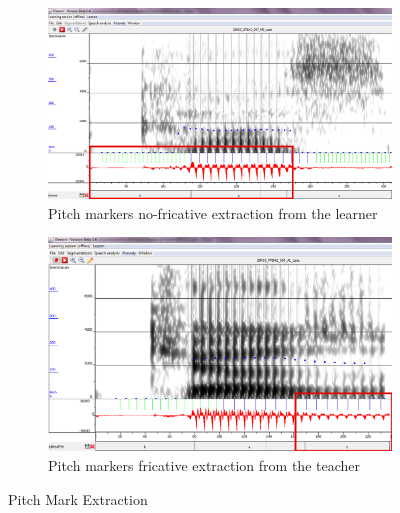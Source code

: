 \documentclass[11pt]{beamer}
\begin{document}

\begin{frame}

\begin{figure}
\begin{subfigure}{.5\textwidth}
  \centering
  \includegraphics[width=0.9\linewidth]{images/case_learner-nonFricative.PNG}
  \caption{Pitch markers no-fricative extraction from the learner}
  \label{fig:sfig1}
\end{subfigure}%
\begin{subfigure}{.5\textwidth}
  \centering
  \includegraphics[width=0.9\linewidth]{images/teacher_case_pitchMarks.PNG}
  \caption{Pitch markers fricative extraction from the teacher}
  \label{fig:sfig2}
\end{subfigure}
\caption{Pitch Mark Extraction}
\label{fig:fig}
\end{figure}
\end{frame}
\end{document}
